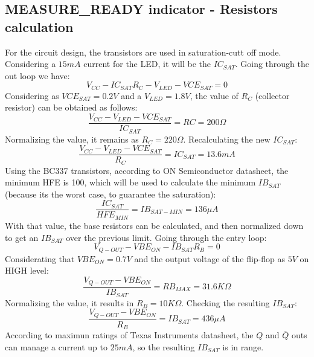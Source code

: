 \subsection*{MEASURE\_READY indicator - Resistors calculation}

For the circuit design, the transistors are used in saturation-cutt off mode. 
Considering a $15mA$ current for the LED, it will be the $IC_{SAT}$. Going through 
the out loop we have:
\[
    V_{CC} - IC_{SAT}R_C - V_{LED} - VCE_{SAT} = 0    
\]
Considering as $VCE_{SAT} = 0.2V$ and a $V_{LED} = 1.8V$, the value of $R_C$ (collector resistor) can be obtained as follows:
\[
    \frac{V_{CC} - V_{LED} - VCE_{SAT}}{IC_{SAT}} = RC = 200 \Omega    
\]
Normalizing the value, it remains as $R_C = 220\Omega $. Recalculating the new $IC_{SAT}$:
\[
    \frac{V_{CC} - V_{LED} - VCE_{SAT}}{R_C} = IC_{SAT} = 13.6mA   
\]
Using the BC337 transistors, according to ON Semiconductor datasheet, the minimum HFE is 100, which will 
be used to calculate the minimum $IB_{SAT}$ (because its the worst case, to guarantee the saturation):
\[
    \frac{IC_{SAT}}{HFE_{MIN}} = IB_{SAT-MIN} = 136\mu A    
\]
With that value, the base resistors can be calculated, and then normalized down to get an $IB_{SAT}$ over 
the previous limit. Going through the entry loop:
\[
    V_{Q-OUT} - VBE_{ON} - IB_{SAT}R_B = 0
\]
Considerating that $VBE_{ON} = 0.7V$ and the output voltage of the flip-flop as $5V$ on HIGH level:
\[
    \frac{V_{Q-OUT} - VBE_{ON}}{IB_{SAT}} = RB_{MAX} = 31.6K\Omega    
\]
Normalizing the value, it results in $R_B = 10 K \Omega$. Checking the resulting $IB_{SAT}$:
\[
    \frac{V_{Q-OUT} - VBE_{ON}}{R_B} = IB_{SAT} = 436\mu A   
\]
According to maximun ratings of Texas Instruments datasheet, the $Q$ and $\overline{Q}$ outs can manage a current
up to $25mA$, so the resulting $IB_{SAT}$ is in range.



